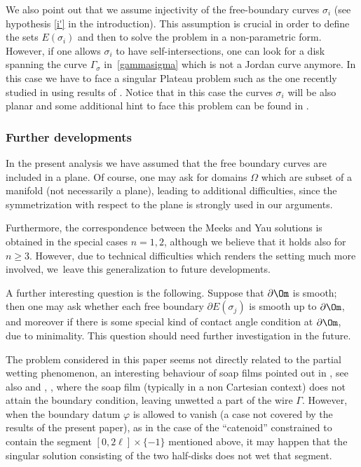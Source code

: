 We also point out that we assume injectivity of the free-boundary
curves $\sigma_i$ (see hypothesis \ref{i'} in the introduction).
This assumption is crucial in order to define the sets
$E(\sigma_i)$ and then to solve the problem in a non-parametric form.
However, if one allows $\sigma_i$ to have self-intersections,
one can look for a disk spanning the curve $\Gamma_\sigma$
in~\eqref{gammasigma} which is not a Jordan curve anymore.
In this case we have to face a singular Plateau problem such as the one
recently studied in \cite{Creutz}
using results of \cite{LW}. Notice that in this case the curves $\sigma_i$ will be also planar and some additional hint to face this problem can be found in \cite{CS}.

\subsubsection*{Further developments} In the present analysis we have assumed that the free boundary curves are included in a plane. Of course, one may ask for domains $\Omega$ which are subset of a manifold (not necessarily a plane), leading to additional difficulties,
since the symmetrization with respect to the plane is strongly used in our arguments.

Furthermore, the correspondence between the Meeks and Yau
solutions is obtained in the special cases $n=1,2$,
although we believe that it holds also for $n\geq3$. However, due to technical difficulties which renders the setting much more involved, we~leave this generalization to future developments.

A further interesting question
is the following. Suppose that
$\partial \Om$ is smooth; then one may ask whether each free
boundary $\partial E(\sigma_j)$
is smooth up to $\partial \Om$, and moreover if there is some special
kind of contact angle condition at $\partial \Om$, due to minimality.
This question should need further investigation in the future.

The problem
considered in this paper seems not directly related to the
partial wetting phenomenon, an interesting behaviour of
soap films pointed out in \cite{Almgren}, see also
\cite{Brakke} and
\cite{2017_Bellettini_Paolini_Pasquarelli}, \cite{BPPS},
where the soap film
(typically in a non Cartesian context) does not
attain the boundary condition, leaving unwetted a part of the
wire $\Gamma$.
However, when the boundary datum $\varphi$ is allowed
to vanish (a case not covered by the results of the present paper),
as in the case of the ``catenoid'' constrained to contain the segment $[0,2\ell] \times \{-1\}$
mentioned above,
it may happen that the
singular solution consisting of
the two half-disks does not wet that segment.


